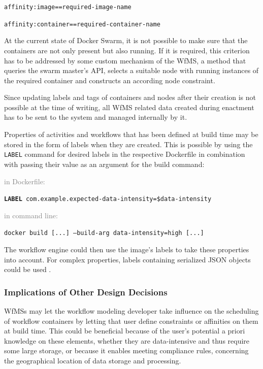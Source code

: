     \centerline{\texttt{affinity:image==required-image-name}}
    \centerline{\texttt{affinity:container==required-container-name}}

    At the current state of Docker Swarm, it is not possible to make sure that the containers are not only present but also running. If it is required, this criterion has to be addressed by some custom mechanism of the \ac{WfMS}, \eg a method that queries the swarm master's \ac{API}, selects a suitable node with running instances of the required container and constructs an according node constraint.

    Since updating labels and tags of containers and nodes after their creation is not possible at the time of writing, all \ac{WfMS} related data created during enactment has to be sent to the system and managed internally by it.

    Properties of activities and workflows that has been defined at build time may be stored in the form of labels when they are created. This is possible by using the \texttt{LABEL} command for desired labels in the respective Dockerfile in combination with passing their value as an argument for the build command:

    \textcolor{gray}{in Dockerfile:}

    \centerline{\texttt{\textbf{LABEL} com.example.expected-data-intensity=\$data-intensity}}

    \textcolor{gray}{in command line:}

    \centerline{\texttt{docker build [...] --build-arg data-intensity=high [...]}}

    The workflow engine could then use the image's labels to take these properties into account. For complex properties, labels containing serialized JSON objects could be used \cite{Docker????Docker}.

  \subsubsection{Implications of Other Design Decisions} %
  \label{ssub:implications_of_other_design_decisions}
    \acp{WfMS} may let the workflow modeling developer take influence on the scheduling of workflow containers by letting that user define constraints or affinities on them at build time. This could be beneficial because of the user's potential a priori knowledge on these elements, \eg whether they are data-intensive and thus require some large storage, or because it enables meeting compliance rules, \eg concerning the geographical location of data storage and processing.

